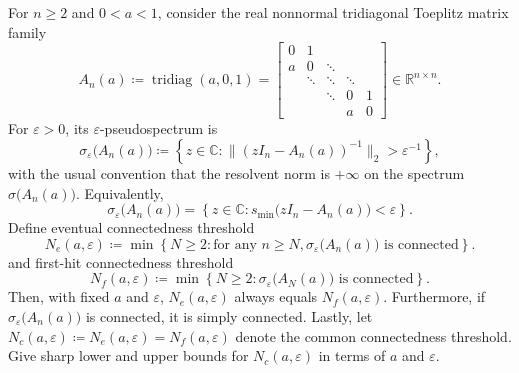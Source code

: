 \documentclass[11pt]{article}
\title{}
\author{}
\date{}
\begin{document}
\maketitle

For \(n\ge 2\) and \(0<a<1\), consider the real nonnormal tridiagonal Toeplitz matrix family
\[
A_n(a)\coloneqq \operatorname{tridiag}(a,0,1)
=
\begin{bmatrix}
0 & 1 \\
a & 0 & \ddots \\
& \ddots & \ddots & \ddots \\
&& \ddots & 0 & 1 \\
&&& a & 0
\end{bmatrix}\in \mathbb{R}^{n\times n}.
\]
For \(\varepsilon>0\), its \(\varepsilon\)-pseudospectrum is
\[
\sigma_\varepsilon\bigl(A_n(a)\bigr)
\coloneqq
\left\{
z\in\mathbb C\colon
\bigl\|(z I_n-A_n(a))^{-1}\bigr\|_2>\varepsilon^{-1}
\right\},
\]
with the usual convention that the resolvent norm is \(+\infty\) on the spectrum \(\sigma\bigl(A_n(a)\bigr)\).
Equivalently,
\[
\sigma_\varepsilon\bigl(A_n(a)\bigr)
=
\left\{
z\in\mathbb C\colon
s_{\min}\bigl(z I_n-A_n(a)\bigr)<\varepsilon
\right\}.
\]
Define eventual connectedness threshold
\[
N_e(a, \varepsilon)\coloneqq\min \left\{N \geq 2\colon \text{for any } n \geq N, \sigma_\varepsilon\bigl(A_n(a)\bigr) \text{ is connected}\right\}.
\]
and first-hit connectedness threshold
\[
N_f(a, \varepsilon)\coloneqq\min \left\{N \geq 2\colon \sigma_\varepsilon\bigl(A_N(a)\bigr) \text{ is connected}\right\}.
\]
Then, with fixed \(a\) and \(\varepsilon\), \(N_e(a, \varepsilon)\) always equals \(N_f(a, \varepsilon)\).
Furthermore, if \(\sigma_\varepsilon\bigl(A_n(a)\bigr)\) is connected, it is simply connected.
Lastly, let \(N_c(a, \varepsilon)\coloneqq N_e(a, \varepsilon)=N_f(a, \varepsilon)\) denote the common connectedness threshold.
Give sharp lower and upper bounds for \(N_c(a, \varepsilon)\) in terms of \(a\) and \(\varepsilon\).
\end{document}
